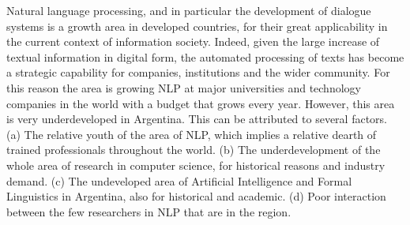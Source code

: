 


Natural language processing, and in particular the development of dialogue
systems is a growth area in developed countries, for their great applicability
in the current context of information society. Indeed, given the large increase
of textual information in digital form, the automated processing of texts has
become a strategic capability for companies, institutions and the wider
community. For this reason the area is growing NLP at major universities and
technology companies in the world with a budget that grows every year. However,
this area is very underdeveloped in Argentina. This can be attributed to several
factors. (a) The relative youth of the area of NLP, which implies a relative
dearth of trained professionals throughout the world. (b) The underdevelopment
of the whole area of research in computer science, for historical reasons and
industry demand. (c) The undeveloped area of Artificial Intelligence and
Formal Linguistics in Argentina, also for historical and academic. (d) Poor
interaction between the few researchers in NLP that are in the region. 

